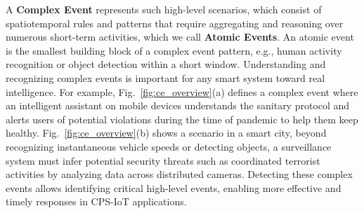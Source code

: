 A \textbf{Complex Event} represents such high-level scenarios, which consist of spatiotemporal rules and patterns that require aggregating and reasoning over numerous short-term activities, which we call \textbf{Atomic Events}. An atomic event is the smallest building block of a complex event pattern, e.g., human activity recognition or object detection within a short window. Understanding and recognizing complex events is important for any smart system toward real intelligence. For example, Fig.~\ref{fig:ce_overview}(a) defines a complex event where an intelligent assistant on mobile devices understands the sanitary protocol and alerts users of potential violations during the time of pandemic to help them keep healthy. Fig.~\ref{fig:ce_overview}(b) shows a scenario in a smart city, beyond recognizing instantaneous vehicle speeds or detecting objects, a surveillance system must infer potential security threats such as coordinated terrorist activities by analyzing data across distributed cameras. Detecting these complex events allows identifying critical high-level events, enabling more effective and timely responses in CPS-IoT applications.


